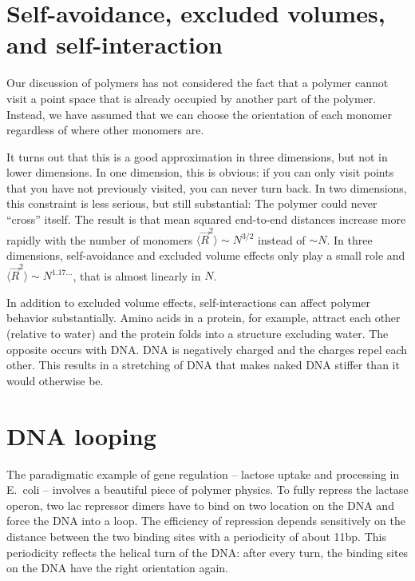 \section*{Self-avoidance, excluded volumes, and self-interaction}
Our discussion of polymers has not considered the fact that a polymer cannot visit a point space that is already occupied by another part of the polymer.
Instead, we have assumed that we can choose the orientation of each monomer regardless of where other monomers are.

It turns out that this is a good approximation in three dimensions, but not in lower dimensions.
In one dimension, this is obvious: if you can only visit points that you have not previously visited, you can never turn back.
In two dimensions, this constraint is less serious, but still substantial: The polymer could never ``cross'' itself. The result is that mean squared end-to-end distances increase more rapidly with the number of monomers $\langle \vec{R}^2\rangle\sim N^{3/2}$ instead of $\sim N$.
In three dimensions, self-avoidance and excluded volume effects only play a small role and $\langle \vec{R}^2\rangle \sim N^{1.17\ldots}$, that is almost linearly in $N$.

In addition to excluded volume effects, self-interactions can affect polymer behavior substantially.
Amino acids in a protein, for example, attract each other (relative to water) and the protein folds into a structure excluding water.
The opposite occurs with DNA. DNA is negatively charged and the charges repel each other.
This results in a stretching of DNA that makes naked DNA stiffer than it would otherwise be.


\section*{DNA looping}
The paradigmatic example of gene regulation -- lactose uptake and processing in E.~coli -- involves a beautiful piece of polymer physics.
To fully repress the lactase operon, two lac repressor dimers have to bind on two location on the DNA and force the DNA into a loop.
The efficiency of repression depends sensitively on the distance between the two binding sites with a periodicity of about 11bp.
This periodicity reflects the helical turn of the DNA: after every turn, the binding sites on the DNA have the right orientation again.


